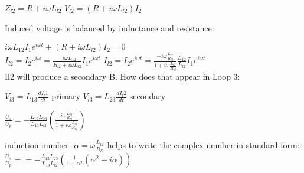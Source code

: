 \documentclass[a4paper,12pt,fleqn]{article}
\begin{document}
$Z_{l2} = R + i\omega L_{l2}$
$V_{l2} = (R + i\omega L_{l2})I_2$

Induced voltage is balanced by inductance and resistance:

$i \omega L_{12} I_1 e^{i\omega t} + (R + i\omega L_{l2})I_2 = 0$\\
$I_{l2} = I_2e^{i\omega } = \frac{-i\omega L_{12}}{R_{l2}+i\omega L_{l2}}I_1e^{i\omega t}$
$I_{l2} = I_2e^{i\omega t} = \frac{-i\omega \frac{L_{l2}}{R_{l2}}}{1+i\omega \frac{L_{l2}}{R_{l2}}}\frac{L_{12}}{L_{l2}}I_1e^{i\omega t}$\\

Il2 will produce a secondary B. How does that appear in Loop 3:

$V_{l3} = L_{13}\frac{dI_l1}{dt}$ primary
$V_{l3} = L_{23}\frac{dI_l2}{dt}$ secondary

$\frac{U_s}{U_p}= -\frac{L_{12}L_{23}}{L_{13}L_{l2}}\left(\frac{i\omega \frac{L_{l2}}{R_{l2}}}{1+i\omega\frac{L_{l2}}{R_{l2}}}\right)$

induction number:
$
\alpha = \omega \frac{L_{l2}}{R_{l2}}
$
helps to write the complex number in standard form:
$\frac{U_s}{U_p}== -\frac{L_{12}L_{23}}{L_{13}L_{l2}} \left(\frac{1}{1+\alpha^2}(\alpha^2+i\alpha) \right)$
\end{document}
